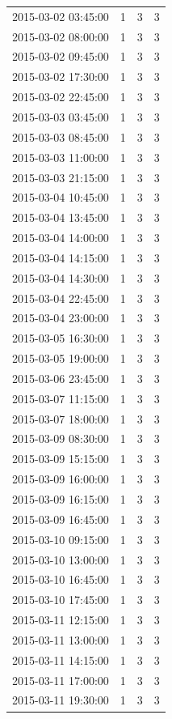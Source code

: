 \begin{tabular}{lrrr}
2015-03-02 03:45:00 & 1 & 3 & 3 \\
2015-03-02 08:00:00 & 1 & 3 & 3 \\
2015-03-02 09:45:00 & 1 & 3 & 3 \\
2015-03-02 17:30:00 & 1 & 3 & 3 \\
2015-03-02 22:45:00 & 1 & 3 & 3 \\
2015-03-03 03:45:00 & 1 & 3 & 3 \\
2015-03-03 08:45:00 & 1 & 3 & 3 \\
2015-03-03 11:00:00 & 1 & 3 & 3 \\
2015-03-03 21:15:00 & 1 & 3 & 3 \\
2015-03-04 10:45:00 & 1 & 3 & 3 \\
2015-03-04 13:45:00 & 1 & 3 & 3 \\
2015-03-04 14:00:00 & 1 & 3 & 3 \\
2015-03-04 14:15:00 & 1 & 3 & 3 \\
2015-03-04 14:30:00 & 1 & 3 & 3 \\
2015-03-04 22:45:00 & 1 & 3 & 3 \\
2015-03-04 23:00:00 & 1 & 3 & 3 \\
2015-03-05 16:30:00 & 1 & 3 & 3 \\
2015-03-05 19:00:00 & 1 & 3 & 3 \\
2015-03-06 23:45:00 & 1 & 3 & 3 \\
2015-03-07 11:15:00 & 1 & 3 & 3 \\
2015-03-07 18:00:00 & 1 & 3 & 3 \\
2015-03-09 08:30:00 & 1 & 3 & 3 \\
2015-03-09 15:15:00 & 1 & 3 & 3 \\
2015-03-09 16:00:00 & 1 & 3 & 3 \\
2015-03-09 16:15:00 & 1 & 3 & 3 \\
2015-03-09 16:45:00 & 1 & 3 & 3 \\
2015-03-10 09:15:00 & 1 & 3 & 3 \\
2015-03-10 13:00:00 & 1 & 3 & 3 \\
2015-03-10 16:45:00 & 1 & 3 & 3 \\
2015-03-10 17:45:00 & 1 & 3 & 3 \\
2015-03-11 12:15:00 & 1 & 3 & 3 \\
2015-03-11 13:00:00 & 1 & 3 & 3 \\
2015-03-11 14:15:00 & 1 & 3 & 3 \\
2015-03-11 17:00:00 & 1 & 3 & 3 \\
2015-03-11 19:30:00 & 1 & 3 & 3 \\

\end{tabular}
